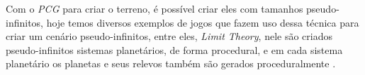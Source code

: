 Com o \textit{PCG} para criar o terreno, é possível criar eles com tamanhos
pseudo-infinitos, hoje temos diversos exemplos de jogos que fazem uso dessa técnica
para criar um cenário pseudo-infinitos, entre eles, \textit{Limit Theory}, nele
são criados pseudo-infinitos sistemas planetários, de forma procedural, e em cada
sistema planetário os planetas e seus relevos também são gerados proceduralmente
\cite{abreu1990toward}.








%
